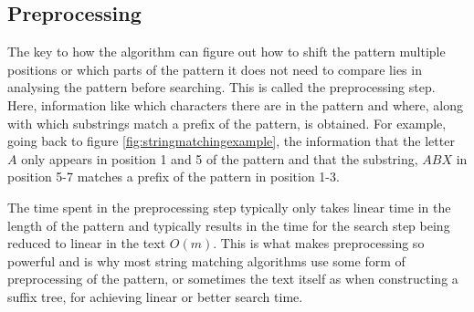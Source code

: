 \subsection{Preprocessing}
The key to how the algorithm can figure out how to shift the pattern multiple positions or which parts of the pattern it does not need to compare lies in analysing the pattern before searching. This is called the preprocessing step. Here, information like which characters there are in the pattern and where, along with which substrings match a prefix of the pattern, is obtained. For example, going back to figure \ref{fig:stringmatchingexample}, the information that the letter $A$ only appears in position 1 and 5 of the pattern and that the substring, $ABX$ in position 5-7 matches a prefix of the pattern in position 1-3. 

The time spent in the preprocessing step typically only takes linear time in the length of the pattern and typically results in the time for the search step being reduced to linear in the text $O(m)$. This is what makes preprocessing so powerful and is why most string matching algorithms use some form of preprocessing of the pattern, or sometimes the text itself as when constructing a suffix tree, for achieving linear or better search time. 

